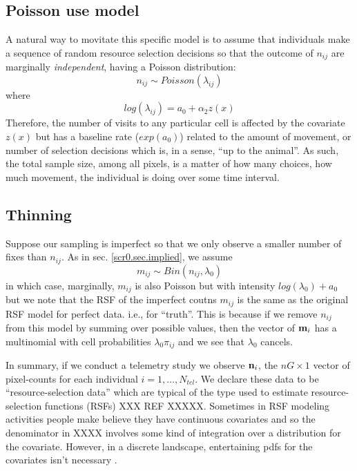 \subsection{Poisson use model}

A natural way to movitate this specific model is to
assume that individuals make a sequence of random resource selection
decisions so that the outcome of $n_{ij}$ are marginally {\it
  independent}, having a Poisson distribution:
\[
 n_{ij} \sim Poisson( \lambda_{ij})
\]
where
\[
 log(\lambda_{ij}) = a_{0}  + \alpha_{2} z(x)
\]
Therefore, the number of visits to any particular cell is affected by
the covariate $z(x)$ but has a baseline rate ($exp(a_{0})$) related to the amount
of movement, or number of selection decisions which is,
in a sense,
``up to the animal''. As such, the total sample size, among all
pixels, is a matter of how many choices, how much movement, the
individual is doing over some time interval.

\subsection{Thinning}

Suppose our sampling is imperfect so that we only observe a smaller
number of fixes than $n_{ij}$. As in sec. \ref{scr0.sec.implied}, we assume
\[
 m_{ij} \sim Bin(n_{ij}, \lambda_{0})
\]
in which case, marginally, $m_{ij}$ is also Poisson but with intensity
$log(\lambda_{0}) + a_{0}$ but we note that the RSF of the imperfect
coutns $m_{ij}$ is the same as the original RSF model for perfect
data. i.e., for ``truth''.
This is because if we remove $n_{ij}$ from this model by summing over
possible values, then the vector of ${\bf m}_{i}$ has a multinomial
with cell probabilities $\lambda_{0}\pi_{ij}$ and we see that
$\lambda_{0}$ cancels. 


In summary, if 
we conduct a telemetry study we observe ${\bf n}_{i}$, the $nG \times
1$ vector of pixel-counts for each individual $i=1,\ldots,N_{tel}$.
We declare these data to be ``resource-selection data'' which are
typical of the type used to estimate resource-selection functions
(RSFs) XXX REF XXXXX. Sometimes in RSF modeling activities people make believe they
have  continuous covariates and so the denominator in XXXX involves
some kind of integration over a distribution for the
covariate. However, in a discrete landscape, entertaining pdfs for the
covariates isn't necessary \citep{royle_etal:2012mee}. 


